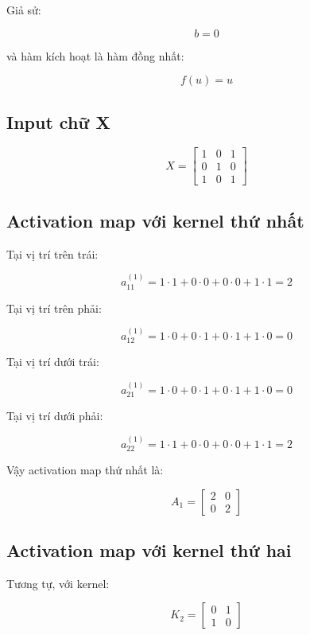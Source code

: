 Giả sử:

\[
    b=0
\]

và hàm kích hoạt là hàm đồng nhất:

\[
    f(u)=u
\]

\subsection{Input chữ X}

\[
    X =
    \begin{bmatrix}
    1 & 0 & 1\\
    0 & 1 & 0\\
    1 & 0 & 1
    \end{bmatrix}
\]

\subsection{Activation map với kernel thứ nhất}

Tại vị trí trên trái:

\[
    a_{11}^{(1)}
    =
    1\cdot1
    +
    0\cdot0
    +
    0\cdot0
    +
    1\cdot1
    =
    2
\]

Tại vị trí trên phải:

\[
    a_{12}^{(1)}
    =
    1\cdot0
    +
    0\cdot1
    +
    0\cdot1
    +
    1\cdot0
    =
    0
\]

Tại vị trí dưới trái:

\[
    a_{21}^{(1)}
    =
    1\cdot0
    +
    0\cdot1
    +
    0\cdot1
    +
    1\cdot0
    =
    0
\]

Tại vị trí dưới phải:

\[
    a_{22}^{(1)}
    =
    1\cdot1
    +
    0\cdot0
    +
    0\cdot0
    +
    1\cdot1
    =
    2
\]

Vậy activation map thứ nhất là:

\[
    A_1 =
    \begin{bmatrix}
    2 & 0\\
    0 & 2
    \end{bmatrix}
\]

\subsection{Activation map với kernel thứ hai}

Tương tự, với kernel:

\[
    K_2 =
    \begin{bmatrix}
    0 & 1\\
    1 & 0
    \end{bmatrix}
\]

